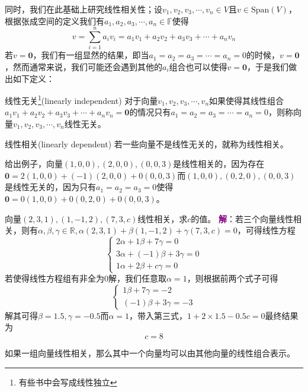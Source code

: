 同时，我们在此基础上研究线性相关性；设$v_1,v_2,v_3,\cdots,v_n \in V$且$v \in \text{Span}(V)$，根据张成空间的定义我们有$a_1,a_2,a_3,\cdots,a_n \in \mathbb{F}$使得$$v = \sum_{i=1}^{n}a_iv_i =a_1v_1+a_2v_2+a_3v_3+\cdots+a_nv_n$$若$v=\boldsymbol{0}$，我们有一组显然的结果，即当$a_1=a_2=a_3=\cdots=a_n=0$的时候，$v=\boldsymbol{0}$，然而通常来说，我们可能还会遇到其他的$a_i$组合也可以使得$v=\boldsymbol{0}$，于是我们做出如下定义：

\begin{definition}{线性无关\footnote{有些书中会写成线性独立}(linearly independent)}
	对于向量$v_1,v_2,v_3,\cdots,v_n$如果使得其线性组合$a_1v_1+a_2v_2+a_3v_3+\cdots+a_nv_n=\boldsymbol{0}$的情况只有$a_1=a_2=a_3=\cdots=a_n=0$，则称向量$v_1,v_2,v_3,\cdots,v_n$线性无关。
\end{definition}

\begin{definition}{线性相关(linearly dependent)}
	若一些向量不是线性无关的，就称为线性相关。
\end{definition}

给出例子，向量$(1,0,0),(2,0,0),(0,0,3)$是线性相关的，因为存在$\boldsymbol{0}=2(1,0,0)+(-1)(2,0,0)+0(0,0,3)$而$(1,0,0),(0,2,0),(0,0,3)$是线性无关的，因为只有$a_1=a_2=a_3=0$使得$\boldsymbol{0}=0(1,0,0)+0(0,2,0)+0(0,0,3)$。

\begin{example}
	向量$(2,3,1),(1,-1,2),(7,3,c)$线性相关，求$c$的值。
	\tcblower
	\textcolor{purple}{\textbf{解}}：若三个向量线性相关，则有$\alpha,\beta,\gamma \in \mathbb{R},\alpha (2,3,1)+\beta (1,-1,2)+\gamma (7,3,c)=0$，可得线性方程$$\left\{\begin{matrix} 
		2\alpha +1\beta+7\gamma = 0 \\  
		3\alpha +(-1)\beta+3\gamma=0 \\
		1\alpha +2\beta+c\gamma=0
	  \end{matrix}\right.$$若使得线性方程组有非全为0解，我们任意取$\alpha = 1$，则根据前两个式子可得$$\left\{\begin{matrix} 
		1\beta+7\gamma = -2 \\
		(-1)\beta+3\gamma= -3 
		\end{matrix}\right.$$解其可得$\beta=1.5,\gamma=-0.5$而$\alpha=1$，带入第三式，$1+2\times 1.5-0.5c=0$最终结果为$$c=8$$
\end{example}

\begin{corollary}
	如果一组向量线性相关，那么其中一个向量均可以由其他向量的线性组合表示。
\end{corollary}

